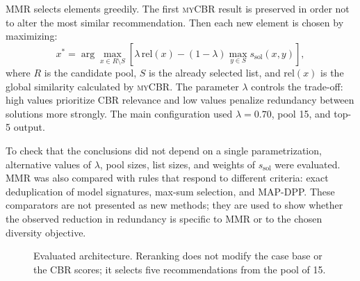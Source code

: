\documentclass[journal]{IEEEtran}
\newcommand{\OPMAD}{\textsc{opmad}}
\newcommand{\OntoCast}{\textsc{OntoCast}}
\newcommand{\myCBR}{\textsc{myCBR}}
\begin{document}
MMR selects elements greedily. The first \myCBR{} result is preserved in order not to alter the most similar recommendation. Then each new element is chosen by maximizing:
\begin{equation}
 x^{*}=\arg\max_{x\in R\setminus S}\left[\lambda\,\mathrm{rel}(x)-(1-\lambda)\max_{y\in S}s_{\mathrm{sol}}(x,y)\right],
 \label{eq:mmr}
\end{equation}
where $R$ is the candidate pool, $S$ is the already selected list, and $\mathrm{rel}(x)$ is the global similarity calculated by \myCBR{}. The parameter $\lambda$ controls the trade-off: high values prioritize CBR relevance and low values penalize redundancy between solutions more strongly. The main configuration used $\lambda=0.70$, pool 15, and top-5 output.

To check that the conclusions did not depend on a single parametrization, alternative values of $\lambda$, pool sizes, list sizes, and weights of $s_{\mathrm{sol}}$ were evaluated. MMR was also compared with rules that respond to different criteria: exact deduplication of model signatures, max-sum selection, and MAP-DPP. These comparators are not presented as new methods; they are used to show whether the observed reduction in redundancy is specific to MMR or to the chosen diversity objective.

\begin{figure}[!t]
\centering
{}
\caption{Evaluated architecture. Reranking does not modify the case base or the CBR scores; it selects five recommendations from the pool of 15.}
\label{fig:architecture}
\end{figure}
\end{document}
